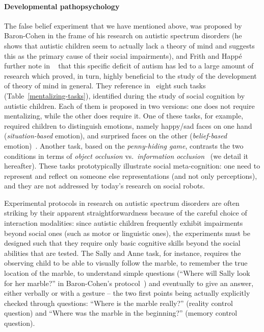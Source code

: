 \documentclass[11pt,a4paper]{report}
\begin{document}
\paragraph{Developmental pathopsychology}

The false belief experiment that we have mentioned above, was proposed by
Baron-Cohen in the frame of his research on autistic spectrum disorders (he
shows that autistic children seem to actually lack a theory of mind and suggests
this as the primary cause of their social impairments), and Frith and Happé
further note in ~\cite{frith1994autism} that this specific deficit of autism has
led to a large amount of research which proved, in turn, highly beneficial to
the study of the development of theory of mind in general. They reference
in~\cite{frith1994autism} eight such tasks (Table~\ref{mentalizing-tasks}),
identified during the study of social cognition by autistic children. Each of
them is proposed in two versions: one does not require mentalizing, while the
other does require it.  One of these tasks, for example, required children to
distinguish emotions, namely happy/sad faces on one hand (\emph{situation-based}
emotion), and surprised faces on the other (\emph{belief-based}
emotion)~\cite{baron1993children}.  Another task, based on the
\emph{penny-hiding game}, contrasts the two conditions in terms of \emph{object
occlusion} vs.~\emph{information occlusion}~\cite{baron1992out} (we detail it
hereafter). These tasks prototypically illustrate social meta-cognition: one
need to represent and reflect on someone else representations (and not only
perceptions), and they are not addressed by today's research on social robots.

Experimental protocols in research on autistic spectrum disorders are often
striking by their apparent straightforwardness because of the careful choice of
interaction modalities: since autistic children frequently exhibit impairments
beyond social ones (such as motor or linguistic ones), the experiments must be
designed such that they require only basic cognitive skills beyond the social
abilities that are tested. The Sally and Anne task, for instance, requires the
observing child to be able to visually follow the marble, to remember the true
location of the marble, to understand simple questions (``Where will Sally look
for her marble?'' in Baron-Cohen's protocol~\cite{baron1985does}) and eventually
to give an answer, either verbally or with a gesture -- the two first points
being actually explicitly checked through questions: ``Where is the marble
really?'' (reality control question) and ``Where was the marble in the
beginning?'' (memory control question).
\end{document}

